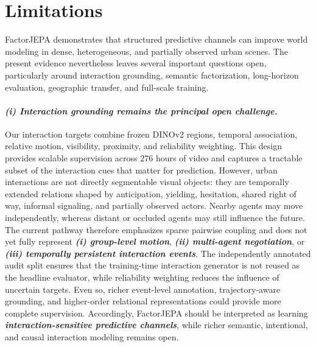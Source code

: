\section{\textbf{Limitations}}

FactorJEPA demonstrates that structured predictive channels can improve world modeling in dense, heterogeneous, and partially observed urban scenes. The present evidence nevertheless leaves several important questions open, particularly around interaction grounding, semantic factorization, long-horizon evaluation, geographic transfer, and full-scale training.

\paragraph{\textbf{\emph{(i) Interaction grounding remains the principal open challenge.}}} Our interaction targets combine frozen DINOv2 regions, temporal association, relative motion, visibility, proximity, and reliability weighting. This design provides scalable supervision across 276 hours of video and captures a tractable subset of the interaction cues that matter for prediction. However, urban interactions are not directly segmentable visual objects: they are temporally extended relations shaped by anticipation, yielding, hesitation, shared right of way, informal signaling, and partially observed actors. Nearby agents may move independently, whereas distant or occluded agents may still influence the future. The current pathway therefore emphasizes sparse pairwise coupling and does not yet fully represent \textbf{\emph{(i) group-level motion}}, \textbf{\emph{(ii) multi-agent negotiation}}, or \textbf{\emph{(iii) temporally persistent interaction events}}. The independently annotated audit split ensures that the training-time interaction generator is not reused as the headline evaluator, while reliability weighting reduces the influence of uncertain targets. Even so, richer event-level annotation, trajectory-aware grounding, and higher-order relational representations could provide more complete supervision. Accordingly, FactorJEPA should be interpreted as learning \textbf{\emph{interaction-sensitive predictive channels}}, while richer semantic, intentional, and causal interaction modeling remains open.

